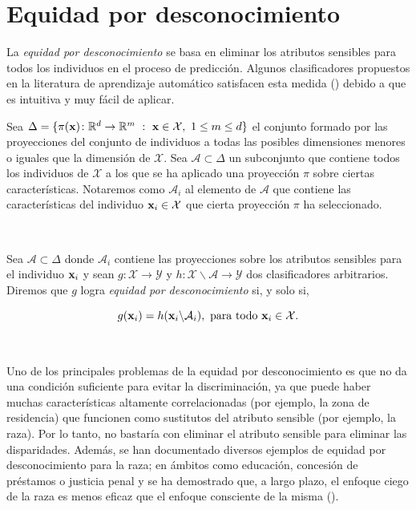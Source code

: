 \documentclass[oneside,openright,titlepage,numbers=noenddot,openany,headinclude,footinclude=true,
cleardoublepage=empty,abstractoff,BCOR=5mm,paper=a4,fontsize=12pt,main=spanish]{scrreprt}
\begin{document}
\section{Equidad por desconocimiento}

\label{sec:eqdesconocimiento}

La \textit{equidad por desconocimiento} se basa en eliminar los atributos sensibles para todos los individuos en el proceso de predicción. Algunos clasificadores propuestos en la literatura de aprendizaje automático satisfacen esta medida (\cite{detect2012}) debido a que es intuitiva y muy fácil de aplicar.

\begin{notation}
Sea $\Delta=\{ \pi(\textbf{x})\colon \mathbb{R}^d \to \mathbb{R}^m  \ : \ \textbf{x} \in \mathcal{X}, \ 1 \leq m \leq d\}$ el conjunto formado por las proyecciones del conjunto de individuos a todas las posibles dimensiones menores o iguales que la dimensión de $\mathcal{X}$. Sea $\mathcal{A} \subset \Delta$ un subconjunto que contiene todos los individuos de $\mathcal{X}$ a los que se ha aplicado una proyección $\pi$ sobre ciertas características. Notaremos como $\mathcal{A}_i$ al elemento de $\mathcal{A}$ que contiene las características del individuo $\textbf{x}_i\in \mathcal{X}$ que cierta proyección $\pi$ ha seleccionado.
\end{notation}\

\begin{definition}
Sea $\mathcal{A} \subset \Delta$ donde $\mathcal{A}_i$ contiene las proyecciones sobre los atributos sensibles para el individuo $\textbf{x}_i$ y sean $g\colon \mathcal{X} \to \mathcal{Y}$ y $h\colon \mathcal{X}\backslash \mathcal{A} \to \mathcal{Y}$ dos clasificadores arbitrarios. Diremos que $g$ logra \textit{equidad por desconocimiento} si, y solo si, 

\begin{equation*} 
g(\textbf{x}_i)=h(\textbf{x}_i \backslash \mathcal{A}_i), \ \text{para todo} \ \textbf{x}_i \in \mathcal{X}.
\end{equation*}
\end{definition}\

Uno de los principales problemas de la equidad por desconocimiento es que no da una condición suficiente para evitar la discriminación, ya que puede haber muchas características altamente correlacionadas (por ejemplo, la zona de residencia) que funcionen como sustitutos del atributo sensible (por ejemplo, la raza). Por lo tanto, no bastaría con eliminar el atributo sensible para eliminar las disparidades. Además, se han documentado diversos ejemplos de equidad por desconocimiento para la raza; en ámbitos como educación, concesión de préstamos o justicia
penal y se ha demostrado que, a largo plazo, el enfoque ciego de la raza es menos eficaz que el enfoque consciente de la misma (\cite{ceguera2008}).
\end{document}
